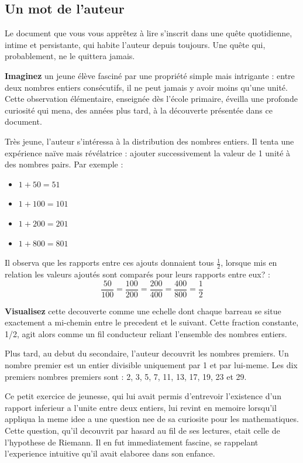 \documentclass[a4paper,11pt]{article}
\newenvironment{resume}{%
    \begin{tcolorbox}[colback=purple!5,colframe=holpurple,title={\textbf{Résumé visuel}}]
}{%
    \end{tcolorbox}
}
\begin{document}
\subsection{Un mot de l'auteur}

Le document que vous vous apprêtez à lire s'inscrit dans une quête quotidienne, intime et persistante, qui habite l'auteur depuis toujours. Une quête qui, probablement, ne le quittera jamais.

\begin{resume}
\textbf{Imaginez} un jeune élève fasciné par une propriété simple mais intrigante : entre deux nombres entiers consécutifs, il ne peut jamais y avoir moins qu'une unité. Cette observation élémentaire, enseignée dès l'école primaire, éveilla une profonde curiosité qui mena, des années plus tard, à la découverte présentée dans ce document.
\end{resume}

Très jeune, l'auteur s'intéressa à la distribution des nombres entiers. Il tenta une expérience naïve mais révélatrice : ajouter successivement la valeur de 1 unité à des nombres pairs. Par exemple :
\begin{itemize}
    \item $1 + 50 = 51$
    \item $1 + 100 = 101$
    \item $1 + 200 = 201$
    \item $1 + 800 = 801$
\end{itemize}

Il observa que les rapports entre ces ajouts donnaient tous $\frac{1}{2}$, lorsque mis en relation les valeurs ajoutés sont comparés pour leurs rapports entre eux? :
\[
\frac{50}{100} = \frac{100}{200} = \frac{200}{400} = \frac{400}{800} = \frac{1}{2}
\]

\begin{resume}
\textbf{Visualisez} cette decouverte comme une echelle dont chaque barreau se situe exactement a mi-chemin entre le precedent et le suivant. Cette fraction constante, 1/2, agit alors comme un fil conducteur reliant l'ensemble des nombres entiers.
\end{resume}

Plus tard, au debut du secondaire, l'auteur decouvrit les nombres premiers. Un nombre premier est un entier divisible uniquement par 1 et par lui-meme. Les dix premiers nombres premiers sont : 2, 3, 5, 7, 11, 13, 17, 19, 23 et 29.

Ce petit exercice de jeunesse, qui lui avait permis d'entrevoir l'existence d'un rapport inferieur a l'unite entre deux entiers, lui revint en memoire lorsqu'il appliqua la meme idee a une question nee de sa curiosite pour les mathematiques. Cette question, qu'il decouvrit par hasard au fil de ses lectures, etait celle de l'hypothese de Riemann. Il en fut immediatement fascine, se rappelant l'experience intuitive qu'il avait elaboree dans son enfance.
\end{document}
